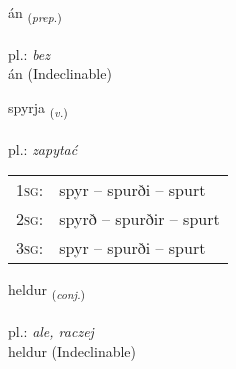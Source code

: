 \documentclass[frontgrid, backgrid]{flacards}\usepackage[]{graphicx}\usepackage[]{xcolor}
\begin{document}
{án \small{\textsubscript{(\textit{prep.})}} \\[1ex]
\textphonetic{[auːn]} \\
pl.: \emph{bez} \\  [2ex]
án (Indeclinable)}

\renewcommand{\flhead}{\vskip5pt \fboxsep=0pt {\small\bfseries\footnotesize Sagnorð | czasownik}}
\renewcommand{\fcfoot}{\vskip5pt \fboxsep=0pt \hspace{2pt}{\small\bfseries\footnotesize 1K}}

\renewcommand{\blhead}{\vskip5pt {\small\bfseries\footnotesize Sagnorð | czasownik }}
\renewcommand{\bcfoot}{\vskip5pt \hspace{2pt}{\small\bfseries\footnotesize 1K}}


{spyrja \small{\textsubscript{(\textit{v.})}} \\[1ex] %
\textphonetic{[spɪrja]} \\
pl.: \emph{zapytać} \\  [2ex]
\renewcommand*{\arraystretch}{0.8}
\begin{tabular}{p{1cm}l}
\textsc{1sg}: & spyr -- spurði -- spurt \\ 
\textsc{2sg}: & spyrð -- spurðir -- spurt \\ 
\textsc{3sg}: & spyr -- spurði -- spurt \\ 
\end{tabular}
}


\renewcommand{\flhead}{\vskip5pt \fboxsep=0pt {\small\bfseries\footnotesize Samtenging | spójnik}}
\renewcommand{\fcfoot}{\vskip5pt \fboxsep=0pt \hspace{2pt}{\small\bfseries\footnotesize 1K}}

\renewcommand{\blhead}{\vskip5pt {\small\bfseries\footnotesize Samtenging | spójnik }}
\renewcommand{\bcfoot}{\vskip5pt \hspace{2pt}{\small\bfseries\footnotesize 1K}}


{heldur \small{\textsubscript{(\textit{conj.})}} \\[1ex]
\textphonetic{[hɛltʏr]} \\
pl.: \emph{ale, raczej} \\  [2ex]
heldur (Indeclinable)}
\end{document}
